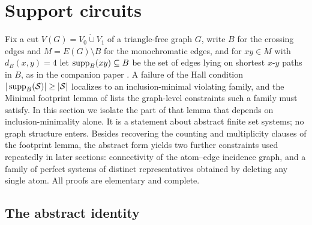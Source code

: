 
\section{Support circuits}\label{sec:support-circuits}

Fix a cut \(V(G)=V_0\mathbin{\dot\cup}V_1\) of a triangle-free graph
\(G\), write \(B\) for the crossing edges and \(M=E(G)\setminus B\) for
the monochromatic edges, and for \(xy\in M\) with \(d_B(x,y)=4\) let
\(\operatorname{supp}_B(xy)\subseteq B\) be the set of edges lying on shortest
\(x\)-\(y\) paths in \(B\), as in the companion paper
\cite{Ferudun26supports}. A failure of the Hall condition
\(|\operatorname{supp}_B(\mathcal S)|\ge|\mathcal S|\) localizes to an
inclusion-minimal violating family, and the Minimal footprint lemma of
\cite{Ferudun26supports} lists the graph-level constraints such a family
must satisfy. In this section we isolate the part of that lemma that
depends on inclusion-minimality alone. It is a statement about abstract
finite set systems; no graph structure enters. Besides recovering the
counting and multiplicity clauses of the footprint lemma, the abstract
form yields two further constraints used repeatedly in later sections:
connectivity of the atom--edge incidence graph, and a family of perfect
systems of distinct representatives obtained by deleting any single
atom. All proofs are elementary and complete.

\subsection{The abstract identity}

